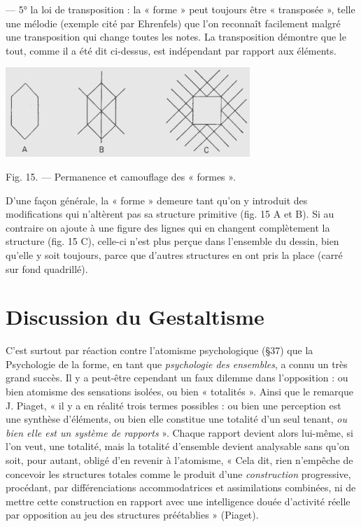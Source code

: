 {— 5° la loi de transposition : la « forme » peut toujours être « transposée »,
telle une mélodie (exemple cité par Ehrenfels) que l’on reconnaît
facilement malgré une transposition qui change toutes les notes. La transposition
démontre que le tout, comme il a été dit ci-dessus, est indépendant
par rapport aux éléments.
\begin{center}
\includegraphics[scale=1.3]{./05_sensible/015}

Fig. 15. — Permanence et camouflage des « formes ».
\end{center}
 D'une façon générale, la « forme » demeure tant
qu’on y introduit des modifications qui n’altèrent pas sa structure primitive
(fig. 15 A et B). Si au contraire on ajoute à une figure des lignes qui
en changent complètement la structure (fig. 15 C), celle-ci n'est plus perçue
dans l’ensemble du dessin, bien qu'elle y soit toujours, parce que d'autres
structures en ont pris la place (carré sur fond quadrillé).}
\vspace{0.31cm}

\section{Discussion du Gestaltisme}%
C'est surtout par réaction
contre l’atomisme psychologique (\S 37) que la Psychologie de la forme,
en tant que {\it psychologie des ensembles}, a connu un très grand succès.
Il y a peut-être cependant un faux dilemme dans l’opposition : ou
bien atomisme des sensations isolées, ou bien « totalités ». Ainsi que
le remarque J. Piaget, « il y a en réalité trois termes possibles : ou
bien une perception est une synthèse d'éléments, ou bien elle constitue
une totalité d’un seul tenant, {\it ou bien elle est un système de rapports} ».
Chaque rapport devient alors lui-même, si l’on veut, une
totalité, mais la totalité d'ensemble devient analysable sans qu'on
soit, pour autant, obligé d’en revenir à l’atomisme, « Cela dit, rien
n'empêche de concevoir les structures totales comme le produit d’une
{\it construction} progressive, procédant, par différenciations accommodatrices
et assimilations combinées, ni de mettre cette construction
en rapport avec une intelligence douée d'activité réelle par opposition
au jeu des structures préétablies » (Piaget).

